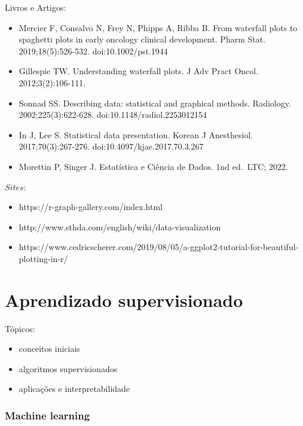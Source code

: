 \documentclass[
  letterpaper,
  DIV=11,
  numbers=noendperiod]{scrreprt}
\providecommand{\tightlist}{%
  \setlength{\itemsep}{0pt}\setlength{\parskip}{0pt}}\usepackage{longtable,booktabs,array}
\begin{document}
Livros e Artigos:

\begin{itemize}
\item
  Mercier F, Consalvo N, Frey N, Phipps A, Ribba B. From waterfall plots
  to spaghetti plots in early oncology clinical development. Pharm Stat.
  2019;18(5):526-532. doi:10.1002/pst.1944
\item
  Gillespie TW. Understanding waterfall plots. J Adv Pract Oncol.
  2012;3(2):106-111.
\item
  Sonnad SS. Describing data: statistical and graphical methods.
  Radiology. 2002;225(3):622-628. doi:10.1148/radiol.2253012154
\item
  In J, Lee S. Statistical data presentation. Korean J Anesthesiol.
  2017;70(3):267-276. doi:10.4097/kjae.2017.70.3.267
\item
  Morettin P, Singer J. Estatística e Ciência de Dados. 1nd ed.~LTC;
  2022.
\end{itemize}

\(Sites\):

\begin{itemize}
\tightlist
\item
  https://r-graph-gallery.com/index.html\\
\item
  http://www.sthda.com/english/wiki/data-visualization
\item
  https://www.cedricscherer.com/2019/08/05/a-ggplot2-tutorial-for-beautiful-plotting-in-r/
\end{itemize}


\hypertarget{aprendizado-supervisionado}{%
\chapter{Aprendizado supervisionado}\label{aprendizado-supervisionado}}

Tópicos:

\begin{itemize}
\item
  conceitos iniciais
\item
  algoritmos supervisionados
\item
  aplicações e interpretabilidade
\end{itemize}

\hypertarget{machine-learning}{%
\subsection{Machine learning}\label{machine-learning}}
\end{document}
